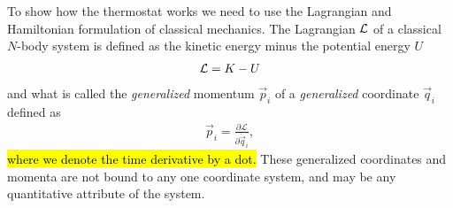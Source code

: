To show how the thermostat works we need to use the Lagrangian and Hamiltonian formulation of classical mechanics. 
The Lagrangian $\operatorname{\mathcal{L}}$ of a classical $N$-body system is defined as the kinetic energy minus the potential energy $U$
\begin{align*}
    \Lag = K - U%
\end{align*}
and what is called the \emph{generalized} momentum $\vec p_i$ of a \emph{generalized} coordinate $\vec q_i$ defined as
\begin{align}
    \vec p_i = \frac{\partial \mathcal{L}}{\partial \dot{\vec q}_i},
    \label{eq:lag_momentum}
\end{align}
\hl{where we denote the time derivative by a dot.} These generalized coordinates and momenta are not bound to any one coordinate system, and may be any quantitative attribute of the system.

